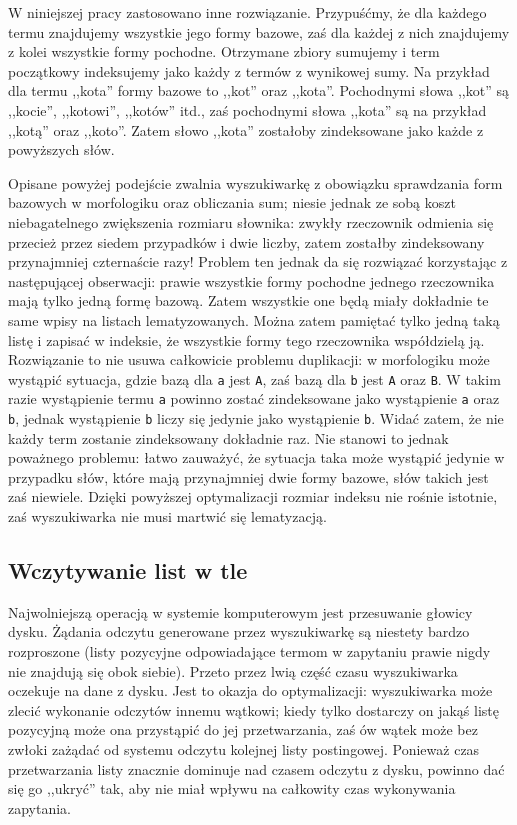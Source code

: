 \documentclass[a4paper,12pt]{article}
\begin{document}
W niniejszej pracy zastosowano inne rozwiązanie. Przypuśćmy, że dla każdego
termu znajdujemy wszystkie jego formy bazowe, zaś dla każdej z nich znajdujemy
z kolei wszystkie formy pochodne. Otrzymane zbiory sumujemy i term początkowy
indeksujemy jako każdy z termów z wynikowej sumy. Na przykład dla termu
,,kota'' formy bazowe to ,,kot'' oraz ,,kota''. Pochodnymi słowa ,,kot'' są
,,kocie'', ,,kotowi'', ,,kotów'' itd., zaś pochodnymi słowa ,,kota'' są
na przykład ,,kotą'' oraz ,,koto''. Zatem słowo ,,kota'' zostałoby zindeksowane
jako każde z powyższych słów.

Opisane powyżej podejście zwalnia wyszukiwarkę z obowiązku sprawdzania form
bazowych w morfologiku oraz obliczania sum; niesie jednak ze sobą koszt
niebagatelnego zwiększenia rozmiaru słownika: zwykły rzeczownik odmienia się
przecież przez siedem przypadków i dwie liczby, zatem zostałby zindeksowany
przynajmniej czternaście razy! Problem ten jednak da się rozwiązać korzystając
z następującej obserwacji: prawie wszystkie formy pochodne jednego rzeczownika
mają tylko jedną formę bazową. Zatem wszystkie one będą miały dokładnie te same
wpisy na listach lematyzowanych. Można zatem pamiętać tylko jedną taką listę
i zapisać w indeksie, że wszystkie formy tego rzeczownika współdzielą ją.
Rozwiązanie to nie usuwa całkowicie problemu duplikacji: w morfologiku może
wystąpić sytuacja, gdzie bazą dla \texttt{a} jest \texttt{A}, zaś bazą dla
\texttt{b} jest \texttt{A} oraz \texttt{B}. W takim razie wystąpienie termu
\texttt{a} powinno zostać zindeksowane jako wystąpienie \texttt{a} oraz
\texttt{b}, jednak wystąpienie \texttt{b} liczy się jedynie jako wystąpienie
\texttt{b}. Widać zatem, że nie każdy term zostanie zindeksowany dokładnie raz.
Nie stanowi to jednak poważnego problemu: łatwo zauważyć, że sytuacja taka może
wystąpić jedynie w przypadku słów, które mają przynajmniej dwie formy bazowe,
słów takich jest zaś niewiele. Dzięki powyższej optymalizacji rozmiar indeksu
nie rośnie istotnie, zaś wyszukiwarka nie musi martwić się lematyzacją.

\subsection{Wczytywanie list w tle}
Najwolniejszą operacją w systemie komputerowym jest przesuwanie głowicy
dysku. Żądania odczytu generowane przez wyszukiwarkę są niestety bardzo
rozproszone (listy pozycyjne odpowiadające termom w zapytaniu prawie
nigdy nie znajdują się obok siebie). Przeto przez lwią część czasu
wyszukiwarka oczekuje na dane z dysku. Jest to okazja do optymalizacji:
wyszukiwarka może zlecić wykonanie odczytów innemu wątkowi; kiedy tylko
dostarczy on jakąś listę pozycyjną może ona przystąpić do jej przetwarzania,
zaś ów wątek może bez zwłoki zażądać od systemu odczytu kolejnej listy
postingowej. Ponieważ czas przetwarzania listy znacznie dominuje nad czasem
odczytu z dysku, powinno dać się go ,,ukryć'' tak, aby nie miał wpływu na
całkowity czas wykonywania zapytania.
\end{document}
